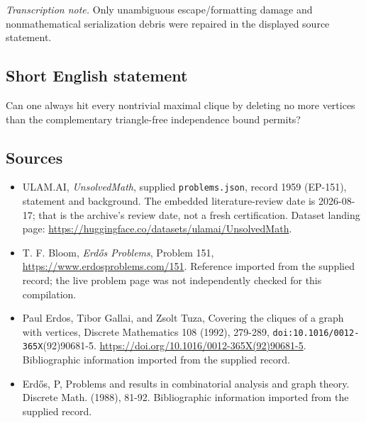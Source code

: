 \documentclass[11pt,a4paper]{article}
\begin{document}
{\small\emph{Transcription note.} Only unambiguous escape/formatting damage and nonmathematical serialization debris were repaired in the displayed source statement.}

\subsection{Short English statement}

Can one always hit every nontrivial maximal clique by deleting no more vertices than the complementary triangle-free independence bound permits?

\subsection{Sources}

{\small

\begin{itemize}

\item[\hypertarget{source:1959:1}{S1}] ULAM.AI, \emph{UnsolvedMath}, supplied \texttt{problems.json}, record 1959 (EP-151), statement and background. The embedded literature-review date is 2026-08-17; that is the archive’s review date, not a fresh certification. Dataset landing page: \url{https://huggingface.co/datasets/ulamai/UnsolvedMath}.

\item[\hypertarget{source:1959:2}{S2}] T. F. Bloom, \emph{Erdős Problems}, Problem 151, \url{https://www.erdosproblems.com/151}. Reference imported from the supplied record; the live problem page was not independently checked for this compilation.

\item[\hypertarget{source:1959:3}{S3}] Paul Erdos, Tibor Gallai, and Zsolt Tuza, Covering the cliques of a graph with vertices, Discrete Mathematics 108 (1992), 279-289, \nolinkurl{doi:10.1016/0012-365X}(92)90681-5. \url{https://doi.org/10.1016/0012-365X(92)90681-5}. Bibliographic information imported from the supplied record.

\item[\hypertarget{source:1959:4}{S4}] Erd\H{o}s, P, Problems and results in combinatorial analysis and graph theory. Discrete Math. (1988), 81-92. Bibliographic information imported from the supplied record.

\end{itemize}

}

\label{end:1959}
\end{document}
